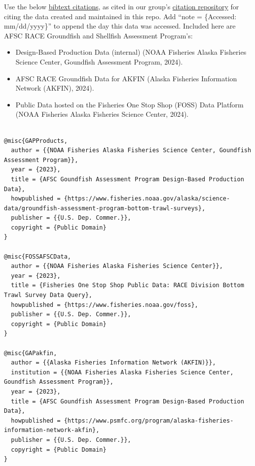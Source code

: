 \documentclass[
  letterpaper,
  oneside,
  open=any]{scrbook}
\providecommand{\tightlist}{%
  \setlength{\itemsep}{0pt}\setlength{\parskip}{0pt}}\usepackage{longtable,booktabs,array}
\begin{document}

Use the below
\href{https://github.com/afsc-gap-products/gap_products/blob/main/CITATION.bib}{bibtext
citations}, as cited in our group's
\href{https://github.com/afsc-gap-products/citations/blob/main/cite/bibliography.bib}{citation
repository} for citing the data created and maintained in this repo. Add
``note = \{Accessed: mm/dd/yyyy\}'' to append the day this data was
accessed. Included here are AFSC RACE Groundfish and Shellfish
Assessment Program's:

\begin{itemize}
\tightlist
\item
  Design-Based Production Data (internal) (NOAA Fisheries Alaska
  Fisheries Science Center, Goundfish Assessment Program, 2024).\\
\item
  AFSC RACE Groundfish Data for AKFIN (Alaska Fisheries Information
  Network (AKFIN), 2024).
\item
  Public Data hosted on the Fisheries One Stop Shop (FOSS) Data Platform
  (NOAA Fisheries Alaska Fisheries Science Center, 2024).
\end{itemize}

\begin{verbatim}

@misc{GAPProducts,
  author = {{NOAA Fisheries Alaska Fisheries Science Center, Goundfish Assessment Program}},
  year = {2023}, 
  title = {AFSC Goundfish Assessment Program Design-Based Production Data},
  howpublished = {https://www.fisheries.noaa.gov/alaska/science-data/groundfish-assessment-program-bottom-trawl-surveys},
  publisher = {{U.S. Dep. Commer.}},
  copyright = {Public Domain} 
}

@misc{FOSSAFSCData,
  author = {{NOAA Fisheries Alaska Fisheries Science Center}},
  year = {2023}, 
  title = {Fisheries One Stop Shop Public Data: RACE Division Bottom Trawl Survey Data Query},
  howpublished = {https://www.fisheries.noaa.gov/foss},
  publisher = {{U.S. Dep. Commer.}},
  copyright = {Public Domain} 
}

@misc{GAPakfin,
  author = {{Alaska Fisheries Information Network (AKFIN)}}, 
  institution = {{NOAA Fisheries Alaska Fisheries Science Center, Goundfish Assessment Program}},
  year = {2023}, 
  title = {AFSC Goundfish Assessment Program Design-Based Production Data},
  howpublished = {https://www.psmfc.org/program/alaska-fisheries-information-network-akfin},
  publisher = {{U.S. Dep. Commer.}},
  copyright = {Public Domain} 
}
\end{verbatim}
\end{document}
